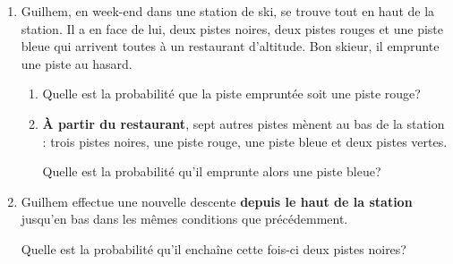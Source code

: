 
\medskip

		\begin{enumerate}
			\item Guilhem, en week-end dans une station de ski, se trouve tout en haut de la station. Il a en face de lui, deux pistes noires, deux pistes rouges et une piste bleue qui arrivent toutes à un restaurant d'altitude. Bon skieur, il emprunte une piste au hasard.
			\begin{enumerate}
				\item Quelle est la probabilité que la piste empruntée soit une piste rouge?
				
				\item \textbf{À partir du restaurant}, sept autres pistes mènent au bas de la station : trois pistes noires, une piste rouge, une piste bleue et deux pistes vertes.
				
Quelle est la probabilité qu'il emprunte alors une piste bleue?
			\end{enumerate}
			
			\item Guilhem effectue une nouvelle descente \textbf{depuis le haut de la station} jusqu'en bas dans les mêmes conditions que précédemment.
			
Quelle est la probabilité qu'il enchaîne cette fois-ci deux pistes noires?
		\end{enumerate}

\vspace{0,5cm}

